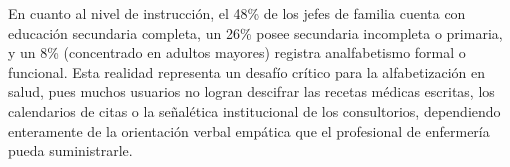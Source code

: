 En cuanto al nivel de instrucción, el 48\% de los jefes de familia cuenta con educación secundaria completa, un 26\% posee secundaria incompleta o primaria, y un 8\% (concentrado en adultos mayores) registra analfabetismo formal o funcional. Esta realidad representa un desafío crítico para la alfabetización en salud, pues muchos usuarios no logran descifrar las recetas médicas escritas, los calendarios de citas o la señalética institucional de los consultorios, dependiendo enteramente de la orientación verbal empática que el profesional de enfermería pueda suministrarle.
